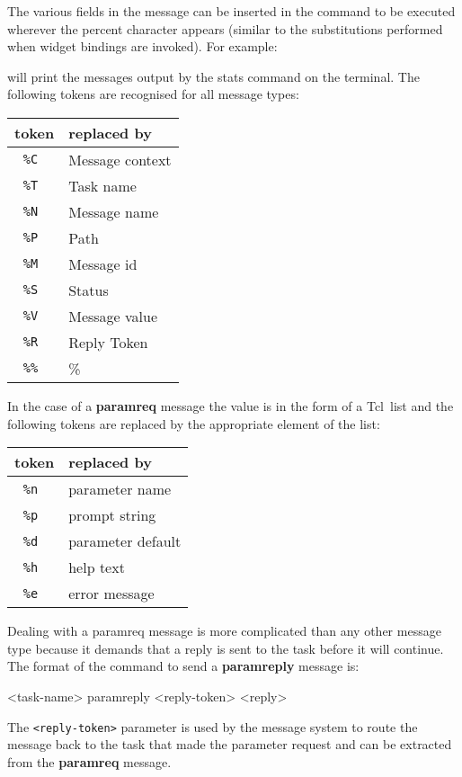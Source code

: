 \documentclass[twoside,11pt,nolof]{starlink}
\providecommand{\Tcl}{{\textsf{Tcl}}}
\begin{document}
The various fields in the message can be inserted in the command to be
executed wherever the percent character appears (similar to the
substitutions performed when widget bindings are invoked). For example:
will print the messages output by the stats command on the terminal.
The following tokens are recognised for all message
types:
\begin{center}
\begin{tabular}{|c|l|}\hline
token &replaced by\\
\hline
\tt\%C &Message context\\
\tt\%T &Task name\\
\tt\%N &Message name\\
\tt\%P &Path\\
\tt\%M &Message id\\
\tt\%S &Status\\
\tt\%V &Message value\\
\tt\%R &Reply Token\\
\tt\%\% &\%\\
\hline
\end{tabular}
\end{center}
In the case of a \textbf{paramreq} message the value is in the form of a
\Tcl\ list and the following tokens are replaced by the appropriate element
of the list:
\begin{center}
\begin{tabular}{|c|l|}\hline
token &replaced by\\
\hline
\tt\%n &parameter name\\
\tt\%p &prompt string\\
\tt\%d &parameter default\\
\tt\%h &help text\\
\tt\%e &error message\\
\hline
\end{tabular}
\end{center}

Dealing with a paramreq message is more complicated than any other
message type because it demands that a reply is sent to the task before it
will continue. The format of the command to send a \textbf{paramreply} message is:
\begin{terminalv}
<task-name> paramreply <reply-token> <reply>
\end{terminalv}
The \texttt{<reply-token>} parameter is used by the
message system to route the message back to the task that made the
parameter request and can be extracted from the \textbf{paramreq} message.
\end{document}
